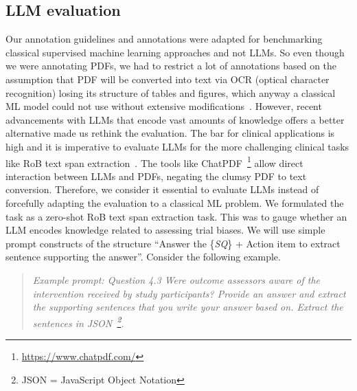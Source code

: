 \documentclass[sn-mathphys,Numbered]{sn-jnl}%
\theoremstyle{thmstyleone}%
\theoremstyle{thmstyletwo}%
\theoremstyle{thmstylethree}%
\begin{document}
\subsection{LLM evaluation}
\label{method:llm}
%
Our annotation guidelines and annotations were adapted for benchmarking classical supervised machine learning approaches and not LLMs.
So even though we were annotating PDFs, we had to restrict a lot of annotations based on the assumption that PDF will be converted into text via OCR (optical character recognition) losing its structure of tables and figures, which anyway a classical ML model could not use without extensive modifications~\cite{li2019figure,li2023uttsr}.
However, recent advancements with LLMs that encode vast amounts of knowledge offers a better alternative made us rethink the evaluation.
The bar for clinical applications is high and it is imperative to evaluate LLMs for the more challenging clinical tasks like RoB text span extraction~\cite{singhal2023large}.
The tools like ChatPDF~\footnote{\url{https://www.chatpdf.com/}} allow direct interaction between LLMs and PDFs, negating the clumsy PDF to text conversion.
Therefore, we consider it essential to evaluate LLMs instead of forcefully adapting the evaluation to a classical ML problem.
We formulated the task as a zero-shot RoB text span extraction task.
This was to gauge whether an LLM encodes knowledge related to assessing trial biases.
We will use simple prompt constructs of the structure ``Answer the \{\textit{SQ}\} + Action item to extract sentence supporting the answer''.
Consider the following example.

\begin{quote}
\itshape Example prompt: Question 4.3 Were outcome assessors aware of the intervention received by study participants? Provide an answer and extract the supporting sentences that you write your answer based on. Extract the sentences in JSON~\footnote{JSON = JavaScript Object Notation}.
\end{quote}
\end{document}
